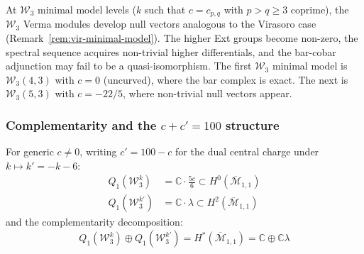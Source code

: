 \begin{remark}
\label{rem:w3-minimal-model}
At $\mathcal{W}_3$ minimal model levels ($k$ such that $c = c_{p,q}$
with $p > q \geq 3$ coprime), the $\mathcal{W}_3$ Verma modules develop
null vectors analogous to the Virasoro case
(Remark~\ref{rem:vir-minimal-model}).  The higher Ext groups become
non-zero, the spectral sequence acquires non-trivial higher
differentials, and the bar-cobar adjunction may fail to be a
quasi-isomorphism.  The first $\mathcal{W}_3$ minimal model is
$\mathcal{W}_3(4,3)$ with $c = 0$ (uncurved), where the bar complex is
exact.  The next is $\mathcal{W}_3(5,3)$ with $c = -22/5$, where
non-trivial null vectors appear.
\end{remark}

\subsubsection{\texorpdfstring{Complementarity and the $c + c' = 100$ structure}{Complementarity and the c + c' = 100 structure}}

\begin{theorem}
\label{thm:w3-genus1-complementarity}
For generic $c \neq 0$, writing $c' = 100 - c$ for the dual central charge
under $k \mapsto k' = -k - 6$:
\begin{align}
Q_1(\mathcal{W}_3^k) &= \mathbb{C} \cdot \tfrac{5c}{6}
  \subset H^0(\overline{\mathcal{M}}_{1,1}) \label{eq:Q1-w3} \\
Q_1(\mathcal{W}_3^{k'}) &= \mathbb{C} \cdot \lambda
  \subset H^2(\overline{\mathcal{M}}_{1,1}) \label{eq:Q1-w3-dual}
\end{align}
and the complementarity decomposition:
\begin{equation}\label{eq:w3-complementarity}
Q_1(\mathcal{W}_3^k) \oplus Q_1(\mathcal{W}_3^{k'})
  = H^*(\overline{\mathcal{M}}_{1,1})
  = \mathbb{C} \oplus \mathbb{C}\lambda
\end{equation}
\end{theorem}

